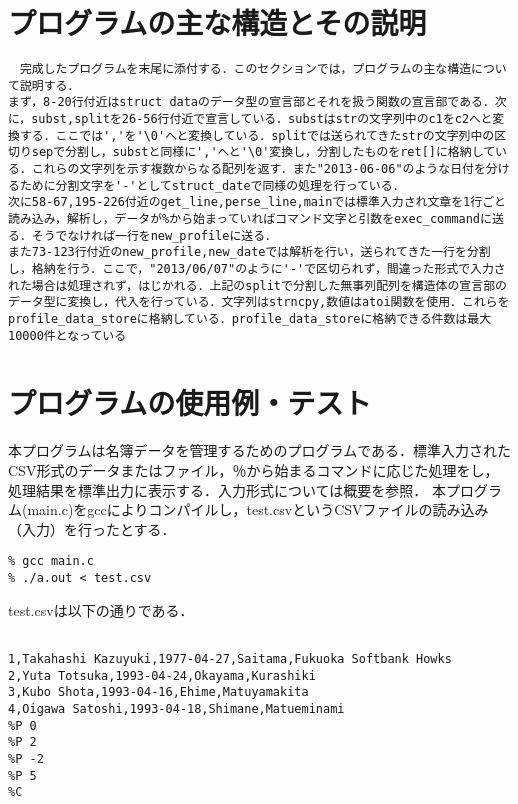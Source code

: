\documentclass[a4j]{jarticle}
\begin{document}
%
%

\section{プログラムの主な構造とその説明}

\begin{verbatim}
　完成したプログラムを末尾に添付する．このセクションでは，プログラムの主な構造について説明する．
まず，8-20行付近はstruct dataのデータ型の宣言部とそれを扱う関数の宣言部である．次に，subst,splitを26-56行付近で宣言している．substはstrの文字列中のc1をc2へと変換する．ここでは','を'\0'へと変換している．splitでは送られてきたstrの文字列中の区切りsepで分割し，substと同様に','へと'\0'変換し，分割したものをret[]に格納している．これらの文字列を示す複数からなる配列を返す．また"2013-06-06"のような日付を分けるために分割文字を'-'としてstruct_dateで同様の処理を行っている．
次に58-67,195-226付近のget_line,perse_line,mainでは標準入力され文章を1行ごと読み込み，解析し，データが%から始まっていればコマンド文字と引数をexec_commandに送る．そうでなければ一行をnew_profileに送る．
また73-123行付近のnew_profile,new_dateでは解析を行い，送られてきた一行を分割し，格納を行う．ここで，"2013/06/07"のように'-'で区切られず，間違った形式で入力された場合は処理されず，はじかれる．上記のsplitで分割した無事列配列を構造体の宣言部のデータ型に変換し，代入を行っている．文字列はstrncpy,数値はatoi関数を使用．これらをprofile_data_storeに格納している．profile_data_storeに格納できる件数は最大10000件となっている

\end{verbatim}

%
%

\section{プログラムの使用例・テスト}

本プログラムは名簿データを管理するためのプログラムである．標準入力されたCSV形式のデータまたはファイル，％から始まるコマンドに応じた処理をし，処理結果を標準出力に表示する．入力形式については概要を参照．
本プログラム(main.c)をgccによりコンパイルし，test.csvというCSVファイルの読み込み（入力）を行ったとする．

{\baselineskip 3mm
\begin{verbatim}
% gcc main.c
% ./a.out < test.csv
\end{verbatim}
}

test.csvは以下の通りである．

{\baselineskip 3mm
\begin{verbatim}

1,Takahashi Kazuyuki,1977-04-27,Saitama,Fukuoka Softbank Howks
2,Yuta Totsuka,1993-04-24,Okayama,Kurashiki
3,Kubo Shota,1993-04-16,Ehime,Matuyamakita
4,Oigawa Satoshi,1993-04-18,Shimane,Matueminami
%P 0
%P 2
%P -2
%P 5
%C
\end{verbatim}
}
\end{document}
